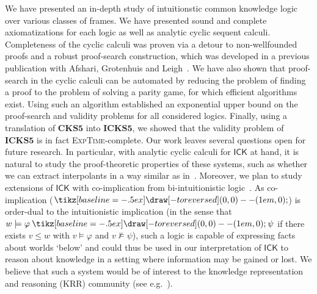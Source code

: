 \documentclass{myifcolog}
\newcommand{\ICK}{\mathsf{ICK}}
\newcommand{\dimp}{\mathbin{\tikz[baseline=-.5ex] \draw[-to reversed] (0,0) -- (1em,0);}}
\numberwithin{theorem}{section}
\begin{document}
We have presented an in-depth study of intuitionstic common knowledge logic over various classes of frames. We have presented sound and complete axiomatizations for each logic as well as analytic cyclic sequent calculi. Completeness of the cyclic calculi was proven via a detour to non-wellfounded proofs and a robust proof-search construction, which was developed in a previous publication with Afshari, Grotenhuis and Leigh~\cite{afshari_intuitionistic_2024}. We have also shown that proof-search in the cyclic calculi can be automated by reducing the problem of finding a proof to the problem of solving a parity game, for which efficient algorithms exist. Using such an algorithm established an exponential upper bound on the proof-search and validity problems for all considered logics. Finally, using a translation of $\mathbf{CKS5}$ into $\mathbf{ICKS5}$, we showed that the validity problem of $\mathbf{ICKS5}$ is in fact \textsc{ExpTime}-complete. Our work leaves several questions open for future research. In particular, with analytic cyclic calculi for $\ICK$ at hand, it is natural to study the proof-theoretic properties of these systems, such as whether we can extract interpolants in a way similar as in~\cite{Afshari_lyndon_2022, Shamkanov_circular_2014}. Moreover, we plan to study extensions of $\ICK$ with co-implication from bi-intuitionistic logic~\cite{Rauszer_1974a, Rauszer_1974b}. As co-implication ($\dimp$) is order-dual to the intuitionistic implication (in the sense that $w \models \varphi \dimp \psi$ if there exists $v \leq w$ with $v \models \varphi$ and $v \not \models \psi$), such a logic is capable of expressing facts about worlds `below' and could thus be used in our interpretation of $\ICK$ to reason about knowledge in a setting where information may be gained or lost. We believe that such a system would be of interest to the knowledge representation and reasoning (KRR) community (see e.g.~\cite{fernandez-duque_family_2023}). 




\end{document}
